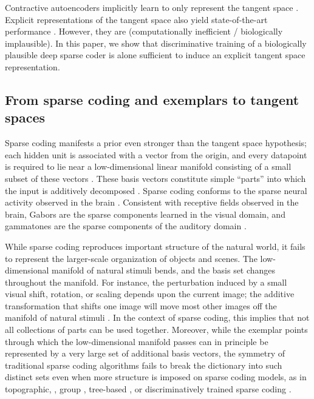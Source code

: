 \documentclass{article} %
\begin{document}
Contractive autoencoders implicitly learn to only represent the tangent space \cite{rifai2011a, rifai2011b}.  Explicit representations of the tangent space also yield state-of-the-art performance \cite{simard1998}.  However, they are (computationally inefficient / biologically implausible).
In this paper, we show that discriminative training of a biologically plausible deep sparse coder is alone sufficient to induce an explicit tangent space representation.

\subsection{From sparse coding and exemplars to tangent spaces}

Sparse coding manifests a prior even stronger than the tangent space hypothesis; each hidden unit is associated with a vector from the origin, and every datapoint is required to lie near a low-dimensional linear manifold consisting of a small subset of these vectors \cite{olshausen1997}. %
These basis vectors constitute simple ``parts'' into which the input is additively decomposed \cite{lee1999}.
Sparse coding conforms to the sparse neural activity observed in the brain \cite{vinje2000, olshausen2004}.  
Consistent with receptive fields observed in the brain, Gabors are the sparse components learned in the visual domain\cite{saxe2011}, and gammatones are the sparse components of the auditory domain \cite{lewicki2002, smith2006}.  


While sparse coding reproduces important structure of the natural world, it fails to represent the larger-scale organization of objects and scenes.  The low-dimensional manifold of natural stimuli bends, and the basis set changes throughout the manifold.  For instance, the perturbation induced by a small visual shift, rotation, or scaling depends upon the current image; the additive transformation that shifts one image will move most other images off the manifold of natural stimuli \cite{simard1998}.  In the context of sparse coding, this implies that not all collections of parts can be used together.  
Moreover, while the exemplar points through which the low-dimensional manifold passes can in principle be represented by a very large set of additional basis vectors, the symmetry of traditional sparse coding algorithms fails to break the dictionary into such distinct sets even when more structure is imposed on sparse coding models, as in topographic, \cite{hyvarinen2001}, group \cite{kavukcuoglu2009}, tree-based \cite{gregor2011}, or discriminatively trained sparse coding \cite{mairal2012, sprechmann2012}.
\end{document}
